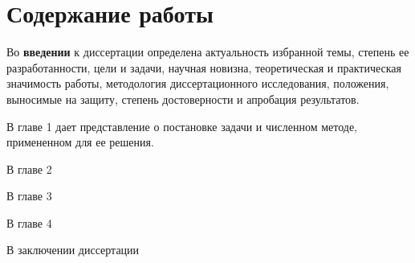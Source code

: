 \section*{\centering Содержание работы}

Во {\bf введении} к диссертации определена актуальность избранной темы, степень ее разработанности, цели и задачи, научная новизна, теоретическая и практическая значимость работы, методология диссертационного исследования, положения, выносимые на защиту, степень достоверности и апробация результатов.

В главе 1 дает представление о постановке задачи и численном методе, примененном для ее решения. 

В главе 2 

В главе 3 

В главе 4

В заключении диссертации 



